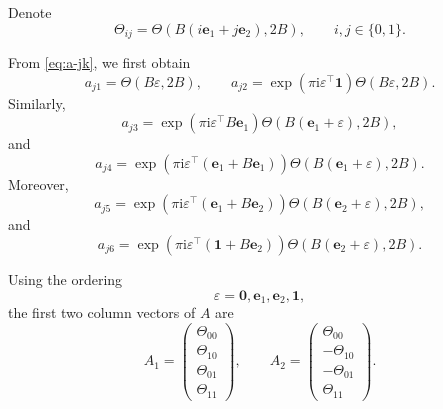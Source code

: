 \documentclass{amsart}
\newcounter{note}
\numberwithin{equation}{hw}
\begin{document}
Denote
\begin{equation}
\Theta_{ij}
=
\Theta\!\left(
B(i\bm{e}_1+j\bm{e}_2),
2B
\right),
\qquad
i,j\in\{0,1\}.
\label{eq:Thetaij}
\end{equation}

From \eqref{eq:a-jk}, we first obtain
\begin{equation}
a_{j1}
=
\Theta(B\varepsilon,2B),
\qquad
a_{j2}
=
\exp\!\left(
\pi\mathrm{i}\varepsilon^{\top}\bm{1}
\right)
\Theta(B\varepsilon,2B).
\label{eq:a12}
\end{equation}
Similarly,
\begin{equation}
a_{j3}
=
\exp\!\left(
\pi\mathrm{i}\varepsilon^{\top}B\bm{e}_1
\right)
\Theta\!\left(
B(\bm{e}_1+\varepsilon),
2B
\right),
\label{eq:a13}
\end{equation}
and
\begin{equation}
a_{j4}
=
\exp\!\left(
\pi\mathrm{i}\varepsilon^{\top}(\bm{e}_1+B\bm{e}_1)
\right)
\Theta\!\left(
B(\bm{e}_1+\varepsilon),
2B
\right).
\label{eq:a14}
\end{equation}
Moreover,
\begin{equation}
a_{j5}
=
\exp\!\left(
\pi\mathrm{i}\varepsilon^{\top}(\bm{e}_1+B\bm{e}_2)
\right)
\Theta\!\left(
B(\bm{e}_2+\varepsilon),
2B
\right),
\label{eq:a15}
\end{equation}
and
\begin{equation}
a_{j6}
=
\exp\!\left(
\pi\mathrm{i}\varepsilon^{\top}(\bm{1}+B\bm{e}_2)
\right)
\Theta\!\left(
B(\bm{e}_2+\varepsilon),
2B
\right).
\label{eq:a16}
\end{equation}

Using the ordering
\[
\varepsilon
=
\bm{0},
\bm{e}_1,
\bm{e}_2,
\bm{1},
\]
the first two column vectors of \(A\) are
\begin{equation}
A_1
=
\begin{pmatrix}
\Theta_{00}\\
\Theta_{10}\\
\Theta_{01}\\
\Theta_{11}
\end{pmatrix},
\qquad
A_2
=
\begin{pmatrix}
\Theta_{00}\\
-\Theta_{10}\\
-\Theta_{01}\\
\Theta_{11}
\end{pmatrix}.
\label{eq:A12}
\end{equation}
\end{document}
